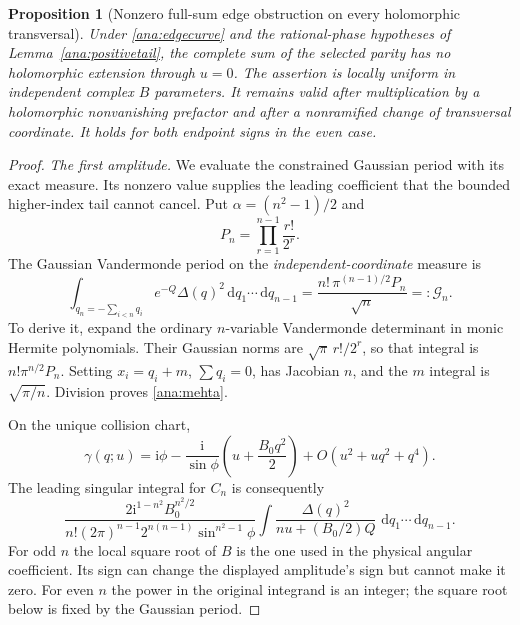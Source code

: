 \documentclass[11pt]{article}
\numberwithin{equation}{section}
\newtheorem{proposition}[theorem]{Proposition}
\theoremstyle{definition}
\newcommand{\ii}{\mathrm i}
\newcommand{\dd}{\,\mathrm d}
\begin{document}
\begin{proposition}[Nonzero full-sum edge obstruction on every
holomorphic transversal]\label{ana:positive}
Under \eqref{ana:edgecurve} and the rational-phase hypotheses of
Lemma~\ref{ana:positivetail}, the complete sum of the selected
parity has no holomorphic extension through \(u=0\).
The assertion is locally uniform in independent complex \(B\)
parameters. It remains valid after multiplication by a
holomorphic nonvanishing prefactor and after a nonramified change
of transversal coordinate. It holds for both endpoint signs in
the even case.
\end{proposition}
\begin{proof}
\emph{The first amplitude.} We evaluate the constrained Gaussian
period with its exact measure. Its nonzero value supplies the
leading coefficient that the bounded higher-index tail cannot cancel.
Put \(\alpha=(n^2-1)/2\) and
\[
 P_n=\prod_{r=1}^{n-1}\frac{r!}{2^r}.
\]
The Gaussian Vandermonde period on the \emph{independent-coordinate}
measure is
\begin{equation}\label{ana:mehta}
 \int_{q_n=-\sum_{i<n}q_i}e^{-Q}\Delta(q)^2
               \dd q_1\cdots\dd q_{n-1}
 =\frac{n!\,\pi^{(n-1)/2}P_n}{\sqrt n}=:\mathcal G_n.
\end{equation}
To derive it, expand the ordinary \(n\)-variable Vandermonde
determinant in monic Hermite polynomials. Their Gaussian norms are
\(\sqrt\pi\,r!/2^r\), so that integral is
\(n!\pi^{n/2}P_n\). Setting \(x_i=q_i+m\), \(\sum q_i=0\),
has Jacobian \(n\), and the \(m\) integral is \(\sqrt{\pi/n}\).
Division proves \eqref{ana:mehta}.

On the unique collision chart,
\[
 \gamma(q;u)=\ii\phi-\frac{\ii}{\sin\phi}
       \left(u+\frac{B_0q^2}{2}\right)
       +O(u^2+u q^2+q^4).
\]
The leading singular integral for \(C_n\) is consequently
\begin{equation}\label{ana:firstintegral}
 \frac{2\ii^{1-n^2}B_0^{n^2/2}}
 {n!(2\pi)^{n-1}2^{n(n-1)}\sin^{n^2-1}\phi}
 \int\frac{\Delta(q)^2}{nu+(B_0/2)Q}\,
             \dd q_1\cdots\dd q_{n-1}.
\end{equation}
For odd \(n\) the local square root of \(B\) is the one used in
the physical angular coefficient. Its sign can change the displayed
amplitude's sign but cannot make it zero. For even \(n\) the
power in the original integrand is an integer; the square root
below is fixed by the Gaussian period.


\end{proof}
\end{document}
